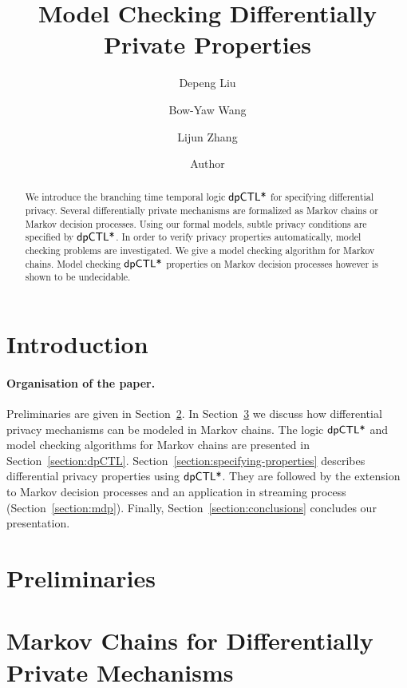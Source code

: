\documentclass{llncs}
\title{Model Checking Differentially Private Properties}
\author{
Depeng Liu\inst{1}
\and
Bow-Yaw Wang\inst{2}
\and
Lijun Zhang\inst{1}}
\institute{
Chinese Academy of Sciences
\and
Academia Sinica
}
\author{Author}
\institute{Institute}
\begin{document}
\maketitle

\begin{abstract}
  We introduce the branching time temporal logic $\textsf{dpCTL*}$ for
  specifying differential privacy. Several differentially private
  mechanisms are formalized as Markov chains or Markov decision
  processes. Using our formal models, subtle privacy conditions
  are specified by $\textsf{dpCTL*}$. In order to verify privacy properties
  automatically, model checking problems are investigated.  We
  give a model checking algorithm for Markov chains. Model checking
  $\textsf{dpCTL*}$ properties on Markov decision processes however is
  shown to be undecidable.
\end{abstract}

\section{Introduction}
\label{section:introduction}


\paragraph{Organisation of the paper.}
Preliminaries are given in Section~\ref{section:preliminaries}. 
In Section~\ref{section:examples} we discuss how differential privacy mechanisms can be modeled in Markov chains.
The logic $\textsf{dpCTL*}$ and model checking algorithms for Markov chains are presented in
Section~\ref{section:dpCTL}. 
Section~\ref{section:specifying-properties} describes differential privacy properties using   $\textsf{dpCTL*}$.
They are followed by the extension to Markov decision processes and an
application in streaming process (Section~\ref{section:mdp}). Finally,
Section~\ref{section:conclusions} concludes our presentation.

\section{Preliminaries}
\label{section:preliminaries}


\section{Markov Chains  for Differentially Private Mechanisms}
\label{section:examples}

\end{document}
